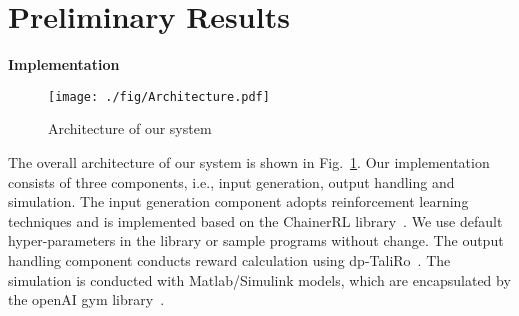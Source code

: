 \section{Preliminary Results}\label{sec:exp}


\noindent\textbf{Implementation}
\begin{figure}[tp]
\centering
\scriptsize
\texttt{[image: ./fig/Architecture.pdf]}
\caption{Architecture of our system}
\label{fig:arch}
\vspace{-7mm}
\end{figure}
%
The overall architecture of our system is shown in Fig.~\ref{fig:arch}.
Our implementation consists of three components, i.e., input generation, output handling and simulation.
The input generation component adopts reinforcement learning techniques and is implemented based on the ChainerRL library~\cite{ChainerRL}.
We use default hyper-parameters in the library or sample programs without change.
The output handling component conducts reward calculation using dp-TaliRo~\cite{S-TaliRo}.
The simulation is conducted with Matlab/Simulink models, which are encapsulated by the openAI gym library~\cite{1606.01540}.
%
